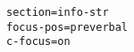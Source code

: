 \documentclass[a4paper]{article}
\begin{document}
{\small\begin{verbatim}
section=info-str
focus-pos=preverbal
c-focus=on
\end{verbatim}}
\end{document}
